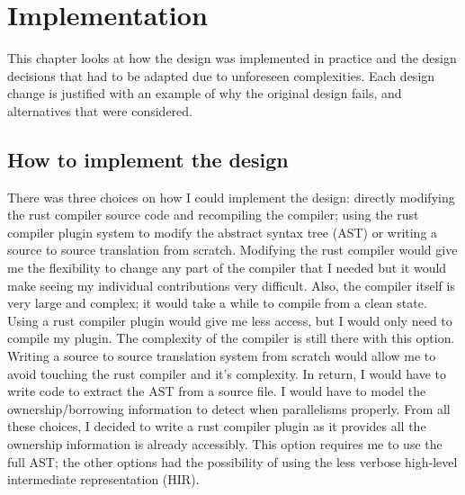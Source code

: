 \chapter{Implementation}
\label{chapter:Implementation}

This chapter looks at how the design was implemented in practice and the design decisions that had to be adapted due to unforeseen complexities. Each design change is justified with an example of why the original design fails, and alternatives that were considered.

\section{How to implement the design}
There was three choices on how I could implement the design: directly modifying the rust compiler source code and recompiling the compiler; using the rust compiler plugin system to modify the abstract syntax tree (AST) or writing a source to source translation from scratch. Modifying the rust compiler would give me the flexibility to change any part of the compiler that I needed but it would make seeing my individual contributions very difficult. Also, the compiler itself is very large and complex; it would take a while to compile from a clean state. Using a rust compiler plugin would give me less access, but I would only need to compile my plugin. The complexity of the compiler is still there with this option. Writing a source to source translation system from scratch would allow me to avoid touching the rust compiler and it's complexity. In return, I would have to write code to extract the AST from a source file. I would have to model the ownership/borrowing information to detect when parallelisms properly. From all these choices, I decided to write a rust compiler plugin as it provides all the ownership information is already accessibly. This option requires me to use the full AST; the other options had the possibility of using the less verbose high-level intermediate representation (HIR).

